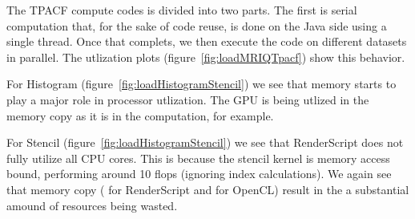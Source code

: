 \FloatBarrier

The TPACF compute codes is divided into two parts.
The first is serial computation that, for the sake of code reuse, is done on the 
  Java side using a single thread.
Once that complets, we then execute the code on different datasets in parallel.
The utlization plots (figure~\ref{fig:loadMRIQTpacf}) show this behavior.  

For Histogram (figure~\ref{fig:loadHistogramStencil}) we see that memory starts
  to play a major role in processor utlization.
The GPU is being utlized in the memory copy as it is in the computation, for example.

For Stencil (figure~\ref{fig:loadHistogramStencil}) we see that RenderScript does
  not fully utilize all CPU cores.
This is because the stencil kernel is memory access bound, performing around 10 flops 
  (ignoring index calculations).
We again see that memory copy ( for RenderScript and
   for OpenCL) result in the a substantial amound of resources being
  wasted.




